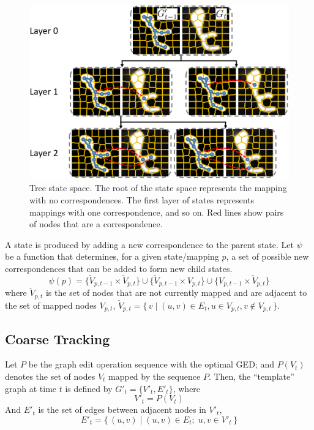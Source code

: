 \documentclass{article}
\begin{document}
\begin{figure}[b!]
	\centering
	\includegraphics[width=\columnwidth]{img/treesearch.png}
	\caption{\small{Tree state space. The root of the state space represents the mapping with no correspondences. The first layer of states represents mappings with one correspondence, and so on. Red lines show pairs of nodes that are a correspondence.}}
	\label{fig:treesearch}
	\vspace{-10pt}
\end{figure}

A state is produced by adding a new correspondence to the parent state. Let $\psi$ be a function that determines, for a given state/mapping $p$, a set of possible new correspondences that can be added to form new child states. 
\small
\begin{equation}
\psi(p) = \{ \check{V}_{p,t-1} \times \check{V}_{p,t} \} \cup \{ \check{V}_{p,t-1} \times V_{p,t} \} \cup \{ V_{p,t-1} \times \check{V}_{p,t} \}
\end{equation}
\normalsize
where $\check{V}_{p,t}$ is the set of nodes that are not currently mapped and are adjacent to the set of mapped nodes $V_{p,t}$, $\check{V}_{p,t} = \{\, v \mid (u,v) \in E_t, u \in V_{p,t}, v \notin V_{p,t} \,\}$.



\subsection{Coarse Tracking}
Let $P$ be the graph edit operation sequence with the optimal GED; and $P(V_t)$ denotes the set of nodes $V_t$ mapped by the sequence $P$. Then, the ``template'' graph at time $t$ is defined by $G'_t =  \{V'_t, E'_t \}$, where
\begin{equation}
V'_t = P(V_t)
\end{equation}
And $E'_t$ is the set of edges between adjacent nodes in $V'_t$, 
\begin{equation}
E'_t = \{\, (u, v) \mid (u, v) \in E_t ;\; u, v \in V'_t \,\}
\end{equation}
\end{document}
